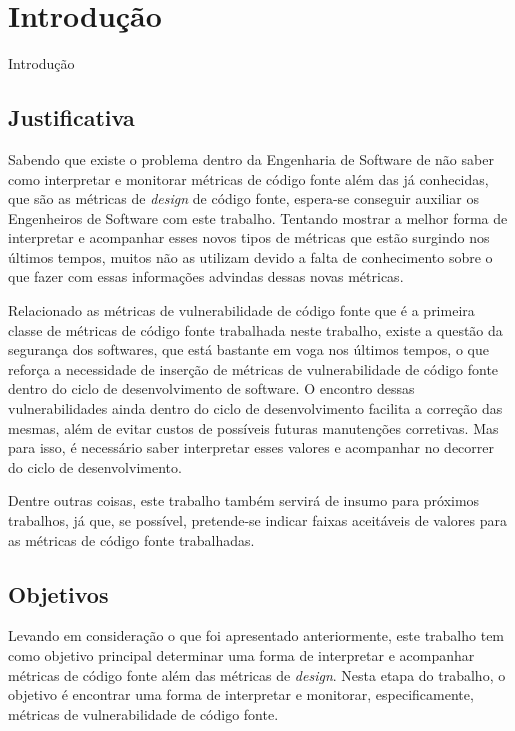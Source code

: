 \chapter{Introdução} \label{cap:introducao}

Introdução

\section{Justificativa}

Sabendo que existe o problema dentro da Engenharia de Software de não saber como
interpretar e monitorar métricas de código fonte além das já conhecidas, que são 
as métricas de \textit{design} de código fonte, espera-se conseguir auxiliar os 
Engenheiros de Software com este trabalho. Tentando mostrar a melhor forma de 
interpretar e acompanhar esses novos tipos de métricas que estão surgindo nos últimos
tempos, muitos não as utilizam devido a falta de conhecimento sobre o que fazer
com essas informações advindas dessas novas métricas.

Relacionado as métricas de vulnerabilidade de código fonte que é a primeira
classe de métricas de código fonte trabalhada neste trabalho, existe a
questão da segurança dos softwares, que está bastante em voga nos últimos
tempos, o que reforça a necessidade de inserção de métricas de vulnerabilidade
de código fonte dentro do ciclo de desenvolvimento de software. O encontro
dessas vulnerabilidades ainda dentro do ciclo de desenvolvimento facilita a
correção das mesmas, além de evitar custos de possíveis futuras manutenções
corretivas. Mas para isso, é necessário saber interpretar esses valores
e acompanhar no decorrer do ciclo de desenvolvimento.

Dentre outras coisas, este trabalho também servirá de insumo para próximos
trabalhos, já que, se possível, pretende-se indicar faixas aceitáveis de valores 
para as métricas de código fonte trabalhadas.

\section{Objetivos} \label{sec:objetivos}

Levando em consideração o que foi apresentado anteriormente, este trabalho tem
como objetivo principal determinar uma forma de interpretar e acompanhar
métricas de código fonte além das métricas de \textit{design}. Nesta
etapa do trabalho, o objetivo é encontrar uma forma de interpretar e monitorar,
especificamente, métricas de vulnerabilidade de código fonte.

